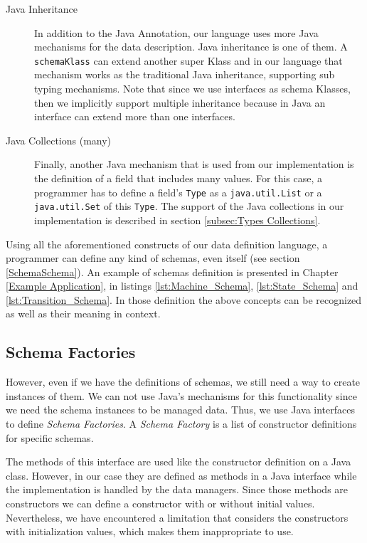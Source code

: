 \begin{description}
	\item [Java Inheritance] In addition to the Java Annotation, our language uses more Java mechanisms for the data description. 
	Java inheritance is one of them. 
	A \texttt{schemaKlass} can extend another super Klass and in our language that mechanism works as the traditional Java inheritance, supporting sub typing mechanisms.
	Note that since we use interfaces as schema Klasses, then we implicitly support multiple inheritance because in Java an interface can extend more than one interfaces.

	\item [Java Collections (many)] Finally, another Java mechanism that is used from our implementation is the definition of a field that includes many values.
	For this case, a programmer has to define a field's \texttt{Type} as a \texttt{java.util.List} or a \texttt{java.util.Set} of this \texttt{Type}. 
	The support of the Java collections in our implementation is described in section \ref{subsec:Types Collections}.

\end{description}

Using all the aforementioned constructs of our data definition language, a programmer can define any kind of schemas, even itself (see section \ref{SchemaSchema}).
An example of schemas definition is presented in Chapter \ref{Example Application}, in listings \ref{lst:Machine_Schema}, \ref{lst:State_Schema} and \ref{lst:Transition_Schema}.
In those definition the above concepts can be recognized as well as their meaning in context.

\subsection{Schema Factories}\label{Schema Factories}
However, even if we have the definitions of schemas, we still need a way to create instances of them.
We can not use Java's mechanisms for this functionality since we need the schema instances to be managed data.
Thus, we use Java interfaces to define \textit{Schema Factories}.
A \textit{Schema Factory} is a list of constructor definitions for specific schemas.

The methods of this interface are used like the constructor definition on a Java class.
However, in our case they are defined as methods in a Java interface while the implementation is handled by the data managers.
Since those methods are constructors we can define a constructor with or without initial values.
Nevertheless, we have encountered a limitation that considers the constructors with initialization values, which makes them inappropriate to use.

